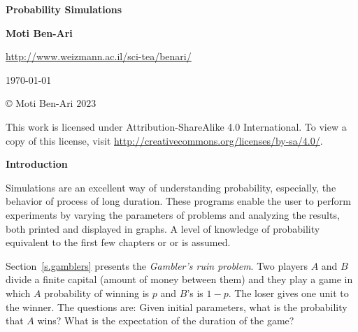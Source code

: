 

\thispagestyle{empty}

\begin{center}
\textbf{\LARGE Probability Simulations}

\bigskip
\bigskip
\bigskip

\textbf{\Large Moti Ben-Ari}

\bigskip

\url{http://www.weizmann.ac.il/sci-tea/benari/}

\bigskip
\bigskip
\bigskip

%

\today

\end{center}

\vfill

\begin{center}
\copyright{} Moti Ben-Ari $2023$
 \end{center}
 
\begin{small}
This work is licensed under Attribution-ShareAlike 4.0 International. To view a copy of this license, visit \url{http://creativecommons.org/licenses/by-sa/4.0/}.
\end{small}
\newpage

\tableofcontents

\newpage

\begin{center}
\textbf{\LARGE Introduction}
\end{center}


\bigskip

Simulations are an excellent way of understanding probability, especially, the behavior of process of long duration. These programs enable the user to perform experiments by varying the parameters of problems and analyzing the results, both printed and displayed in graphs. A level of knowledge of probability equivalent to the first few chapters or \cite{BW} or \cite{ross} is assumed.

Section~\ref{s.gamblers} presents the \emph{Gambler's ruin problem}. Two players $A$ and $B$ divide a finite capital (amount of money between them) and they play a game in which $A$ probability of winning is $p$ and $B$'s is $1-p$. The loser gives one unit to the winner. The questions are: Given initial parameters, what is the probability that $A$ wins? What is the expectation of the duration of the game?

